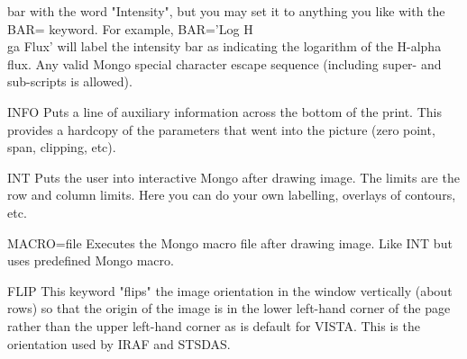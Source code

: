 {\begin{example}
{          bar with the word "Intensity", but you may set it to 
          anything you like with the BAR= keyword.  For example,
          BAR='Log H\\ga Flux' will label the intensity bar as
          indicating the logarithm of the H-alpha flux.  Any valid
          Mongo special character escape sequence (including 
          super- and sub-scripts is allowed).}
  \item[INFO]{Puts a line of auxiliary information across the bottom of
          the print.  This provides a hardcopy of the parameters
          that went into the picture (zero point, span, clipping, etc).}
  \item[INT]{Puts the user into interactive Mongo after drawing image. The
          limits are the row and column limits. Here you can do your
          own labelling, overlays of contours, etc.}
  \item[MACRO=file]{Executes the Mongo macro file after drawing image. Like
          INT but uses predefined Mongo macro.}
  \item[FLIP]{This keyword "flips" the image orientation in the window
          vertically (about rows) so that the origin of the image is
          in the lower left-hand corner of the page rather than the
          upper left-hand corner as is default for VISTA.  This is
          the orientation used by IRAF and STSDAS.}
\end{example}%
\lthtmlfigureZ
\lthtmlcheckvsize\clearpage}


